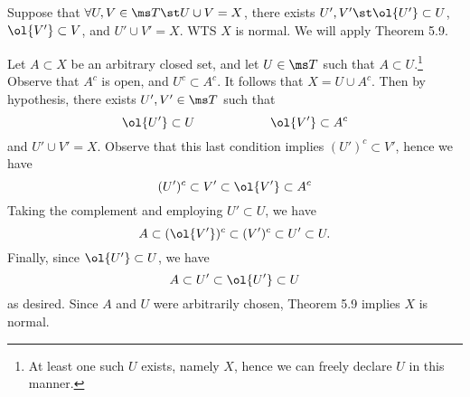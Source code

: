 \documentclass{fkpset}
\begin{document}
\begin{solution}
\begin{iffproof}
      \item Suppose that $\forall U,V \in \ms T \st U \cup V = X$,
        there exists $U', V' \st \ol{U'} \subset U$, $\ol{V'} \subset
        V$, and $U' \cup V' = X$. WTS $X$ is normal. We will apply
        Theorem 5.9.

        Let $A \subset X$ be an arbitrary closed set, and let $U \in
        \ms T$ such that $A \subset U$.\footnote{At least one such $U$
          exists, namely $X$, hence we can freely declare $U$ in this
          manner.} Observe that $A^c$ is open, and $U^c \subset A^c$.
        It follows that $X = U \cup A^c$. Then by hypothesis, there
        exists $U',V' \in \ms T$ such that
        \[
          \ol{U'} \subset U \qquad \qquad \qquad \ol{V'} \subset A^c
        \]
        and $U' \cup V' = X$. Observe that this last condition implies
        $(U')^c \subset V'$, hence we have
        \[
          (U')^c \subset V' \subset \ol{V'} \subset A^c
        \]
        Taking the complement and employing $U' \subset U$, we have
        \[
          A \subset (\ol{V'})^c \subset (V')^c \subset U' \subset U.
        \]
        Finally, since $\ol{U'} \subset U$, we have
        \[
          A \subset U' \subset \ol{U'} \subset U
        \]
        as desired. Since $A$ and $U$ were arbitrarily chosen, Theorem
        5.9 implies $X$ is normal.
    \end{iffproof}
  \end{solution}
  \clearpage
\end{document}
